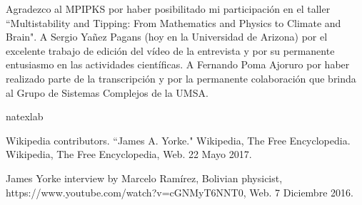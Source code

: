 \documentclass{rbf}
\begin{document}
\begin{acknowledgments}
Agradezco al MPIPKS por haber posibilitado mi participación en el taller ``Multistability and Tipping: From Mathematics and Physics to Climate and Brain". A Sergio Yañez Pagans (hoy en la Universidad de Arizona) por el excelente trabajo de edición del vídeo de la entrevista y por su permanente entusiasmo en las actividades científicas. A Fernando Poma Ajoruro por haber realizado parte de la transcripción y por la permanente colaboración que brinda al Grupo de Sistemas Complejos de la UMSA.
\end{acknowledgments}

\begin{thebibliography}{32}
\expandafter\ifx\csname natexlab\endcsname\relax\def\natexlab#1{#1}\fi


Wikipedia contributors. ``James A. Yorke." Wikipedia, The Free Encyclopedia. Wikipedia, The Free Encyclopedia, Web. 22 Mayo 2017.



James Yorke interview by Marcelo Ramírez, Bolivian physicist, https://www.youtube.com/watch?v=cGNMyT6NNT0, Web. 7 Diciembre 2016.
\end{thebibliography}
\end{document}
